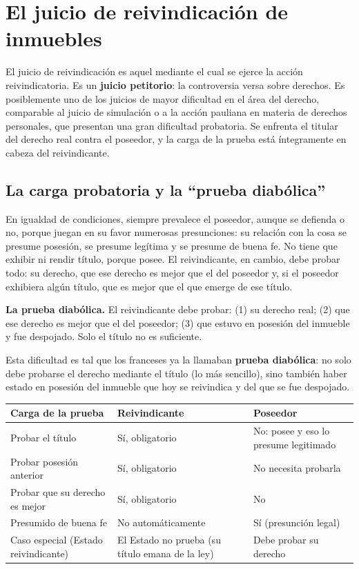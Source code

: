 \documentclass[12pt,oneside]{book}
\begin{document}
\section{El juicio de reivindicación de inmuebles}

El juicio de reivindicación es aquel mediante el cual se ejerce la acción reivindicatoria. Es un \textbf{juicio petitorio}: la controversia versa sobre derechos. Es posiblemente uno de los juicios de mayor dificultad en el área del derecho, comparable al juicio de simulación o a la acción pauliana en materia de derechos personales, que presentan una gran dificultad probatoria. Se enfrenta el titular del derecho real contra el poseedor, y la carga de la prueba está íntegramente en cabeza del reivindicante.

\subsection{La carga probatoria y la ``prueba diabólica''}

En igualdad de condiciones, siempre prevalece el poseedor, aunque se defienda o no, porque juegan en su favor numerosas presunciones: su relación con la cosa se presume posesión, se presume legítima y se presume de buena fe. No tiene que exhibir ni rendir título, porque posee. El reivindicante, en cambio, debe probar todo: su derecho, que ese derecho es mejor que el del poseedor y, si el poseedor exhibiera algún título, que es mejor que el que emerge de ese título.

\begin{importante}
\textbf{La prueba diabólica.} El reivindicante debe probar: (1) su derecho real; (2) que ese derecho es mejor que el del poseedor; (3) que estuvo en posesión del inmueble y fue despojado. Solo el título no es suficiente.
\end{importante}

Esta dificultad es tal que los franceses ya la llamaban \textbf{prueba diabólica}: no solo debe probarse el derecho mediante el título (lo más sencillo), sino también haber estado en posesión del inmueble que hoy se reivindica y del que se fue despojado.

\begin{table}[H]
\centering
\small
\begin{tabularx}{\textwidth}{@{}>{\raggedright\arraybackslash}p{}>{\raggedright\arraybackslash}X>{\raggedright\arraybackslash}X@{}}
\toprule
\textbf{Carga de la prueba} & \textbf{Reivindicante} & \textbf{Poseedor} \\
\midrule
Probar el título & Sí, obligatorio & No: posee y eso lo presume legitimado \\
Probar posesión anterior & Sí, obligatorio & No necesita probarla \\
Probar que su derecho es mejor & Sí, obligatorio & No \\
Presumido de buena fe & No automáticamente & Sí (presunción legal) \\
Caso especial (Estado reivindicante) & El Estado no prueba (su título emana de la ley) & Debe probar su derecho \\
\bottomrule
\end{tabularx}
\end{table}
\end{document}
